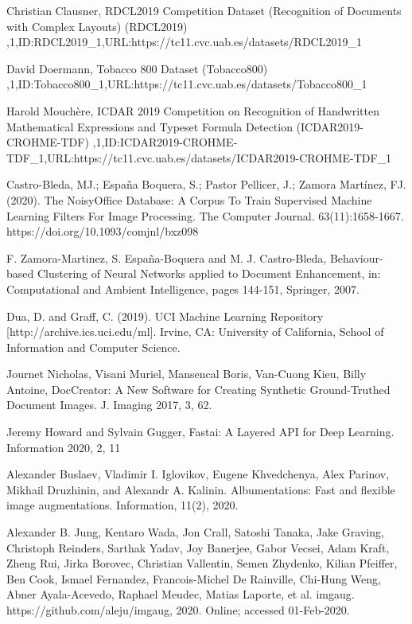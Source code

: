 \documentclass[runningheads]{llncs}
\begin{document}
%
%
%
% 
% 
%
\begin{thebibliography}{8}
{Christian Clausner, RDCL2019 Competition Dataset (Recognition of Documents with Complex Layouts) (RDCL2019) ,1,ID:RDCL2019\_1,URL:https://tc11.cvc.uab.es/datasets/RDCL2019_1}

{David Doermann, Tobacco 800 Dataset (Tobacco800) ,1,ID:Tobacco800_1,URL:https://tc11.cvc.uab.es/datasets/Tobacco800_1}

{Harold Mouchère, ICDAR 2019 Competition on Recognition of Handwritten Mathematical Expressions and Typeset Formula Detection (ICDAR2019-CROHME-TDF) ,1,ID:ICDAR2019-CROHME-TDF\_1,URL:https://tc11.cvc.uab.es/datasets/ICDAR2019-CROHME-TDF_1}

{Castro-Bleda, MJ.; España Boquera, S.; Pastor Pellicer, J.; Zamora Martínez, FJ. (2020). The NoisyOffice Database: A Corpus To Train Supervised Machine Learning Filters For Image Processing. The Computer Journal. 63(11):1658-1667. https://doi.org/10.1093/comjnl/bxz098}

{F. Zamora-Martinez, S. España-Boquera and M. J. Castro-Bleda, Behaviour-based Clustering of Neural Networks applied to Document Enhancement, in: Computational and Ambient Intelligence, pages 144-151, Springer, 2007.}

{Dua, D. and Graff, C. (2019). UCI Machine Learning Repository [http://archive.ics.uci.edu/ml]. Irvine, CA: University of California, School of Information and Computer Science.}

  {Journet Nicholas, Visani Muriel, Mansencal Boris, Van-Cuong Kieu, Billy Antoine, DocCreator: A New Software for Creating Synthetic Ground-Truthed Document Images. J. Imaging 2017, 3, 62.}

{Jeremy Howard and Sylvain Gugger, Fastai: A Layered API for Deep Learning. Information 2020, 2, 11}

{Alexander Buslaev, Vladimir I. Iglovikov, Eugene Khvedchenya, Alex Parinov, Mikhail Druzhinin, and Alexandr A. Kalinin. Albumentations: Fast and flexible image augmentations. Information, 11(2), 2020.}

{Alexander B. Jung, Kentaro Wada, Jon Crall, Satoshi Tanaka, Jake Graving, Christoph Reinders, Sarthak Yadav, Joy Banerjee, Gabor Vecsei, Adam Kraft, Zheng Rui, Jirka Borovec, Christian Vallentin, Semen Zhydenko, Kilian Pfeiffer, Ben Cook, Ismael Fernandez, Francois-Michel De Rainville, Chi-Hung Weng, Abner Ayala-Acevedo, Raphael Meudec, Matias Laporte, et al. imgaug. https://github.com/aleju/imgaug, 2020. Online; accessed 01-Feb-2020.}
\end{thebibliography}
\end{document}
